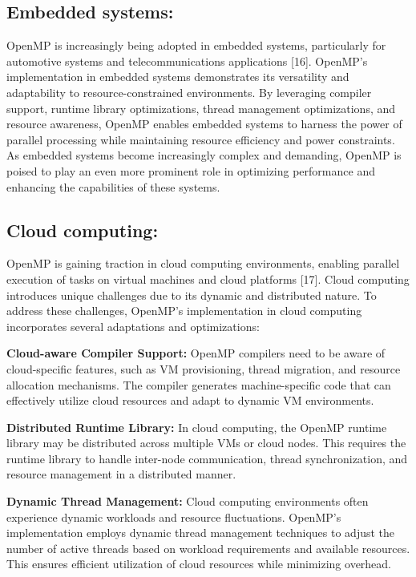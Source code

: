 \documentclass[12pt,conference]{IEEEtran}
\begin{document}
\subsection{Embedded systems:} OpenMP is increasingly being adopted in embedded systems, particularly for automotive systems and telecommunications applications [16]. OpenMP's implementation in embedded systems demonstrates its versatility and adaptability to resource-constrained environments. By leveraging compiler support, runtime library optimizations, thread management optimizations, and resource awareness, OpenMP enables embedded systems to harness the power of parallel processing while maintaining resource efficiency and power constraints. As embedded systems become increasingly complex and demanding, OpenMP is poised to play an even more prominent role in optimizing performance and enhancing the capabilities of these systems.



\subsection{Cloud computing:} OpenMP is gaining traction in cloud computing environments, enabling parallel execution of tasks on virtual machines and cloud platforms [17]. Cloud computing introduces unique challenges due to its dynamic and distributed nature. To address these challenges, OpenMP's implementation in cloud computing incorporates several adaptations and optimizations:

\textbf{Cloud-aware Compiler Support:} OpenMP compilers need to be aware of cloud-specific features, such as VM provisioning, thread migration, and resource allocation mechanisms. The compiler generates machine-specific code that can effectively utilize cloud resources and adapt to dynamic VM environments.

\textbf{Distributed Runtime Library:} In cloud computing, the OpenMP runtime library may be distributed across multiple VMs or cloud nodes. This requires the runtime library to handle inter-node communication, thread synchronization, and resource management in a distributed manner.

\textbf{Dynamic Thread Management:} Cloud computing environments often experience dynamic workloads and resource fluctuations. OpenMP's implementation employs dynamic thread management techniques to adjust the number of active threads based on workload requirements and available resources. This ensures efficient utilization of cloud resources while minimizing overhead.
\end{document}
